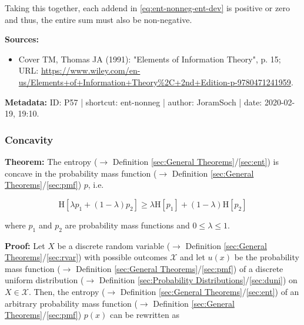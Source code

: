 \documentclass[a4paper,12pt,twoside]{book}
\begin{document}
Taking this together, each addend in \eqref{eq:ent-nonneg-ent-dev} is positive or zero and thus, the entire sum must also be non-negative.


\vspace{1em}
\textbf{Sources:}
\begin{itemize}
\item Cover TM, Thomas JA (1991): "Elements of Information Theory", p. 15; URL: \url{https://www.wiley.com/en-us/Elements+of+Information+Theory%2C+2nd+Edition-p-9780471241959}.
\end{itemize}


\vspace{1em}
\textbf{Metadata:} ID: P57 | shortcut: ent-nonneg | author: JoramSoch | date: 2020-02-19, 19:10.
\vspace{1em}



\subsubsection[\textbf{Concavity}]{Concavity} \label{sec:ent-conc}
\setcounter{equation}{0}

\textbf{Theorem:} The entropy ($\rightarrow$ Definition \ref{sec:General Theorems}/\ref{sec:ent}) is concave in the probability mass function ($\rightarrow$ Definition \ref{sec:General Theorems}/\ref{sec:pmf}) $p$, i.e.

\begin{equation} \label{eq:ent-conc-ent-conc}
\mathrm{H}[\lambda p_1 + (1-\lambda) p_2] \geq \lambda \mathrm{H}[p_1] + (1-\lambda) \mathrm{H}[p_2]
\end{equation}

where $p_1$ and $p_2$ are probability mass functions and $0 \leq \lambda \leq 1$.


\vspace{1em}
\textbf{Proof:} Let $X$ be a discrete random variable ($\rightarrow$ Definition \ref{sec:General Theorems}/\ref{sec:rvar}) with possible outcomes $\mathcal{X}$ and let $u(x)$ be the probability mass function ($\rightarrow$ Definition \ref{sec:General Theorems}/\ref{sec:pmf}) of a discrete uniform distribution ($\rightarrow$ Definition \ref{sec:Probability Distributions}/\ref{sec:duni}) on $X \in \mathcal{X}$. Then, the entropy ($\rightarrow$ Definition \ref{sec:General Theorems}/\ref{sec:ent}) of an arbitrary probability mass function ($\rightarrow$ Definition \ref{sec:General Theorems}/\ref{sec:pmf}) $p(x)$ can be rewritten as
\end{document}
